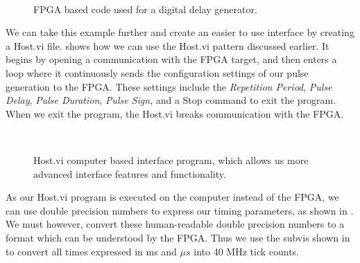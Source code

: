 \begin{figure}[!ht]
  \centering
   \\
  \caption[Digital delay generator FPGA.vi]{FPGA based code used for a digital delay generator.}
  \label{fig:ddg_fpga}
\end{figure}


We can take this example further and create an easier to use interface by creating a Host.vi file.   shows how we can use the Host.vi pattern discussed earlier.  It begins by opening a communication with the FPGA target, and then enters a loop where it continuously sends the configuration settings of our pulse generation to the FPGA.  These settings include the \emph{Repetition Period}, \emph{Pulse Delay}, \emph{Pulse Duration}, \emph{Pulse Sign}, and a Stop command to exit the program.  When we exit the program, the Host.vi breaks communication with the FPGA.


\begin{figure}[!htb]
  \centering
   \\
  \caption[Digital delay generator Host.vi]{Host.vi computer based interface program, which allows us more advanced interface features and functionality.}
  \label{fig:ddg_host}
\end{figure}

As our Host.vi program is executed on the computer instead of the FPGA, we can use double precision numbers to express our timing parameters, as shown in .  We must however, convert these human-readable double precision numbers to a format which can be understood by the FPGA.  Thus we use the subvis shown in  to convert all times expressed in ms and $\mu s$ into 40 MHz tick counts.




